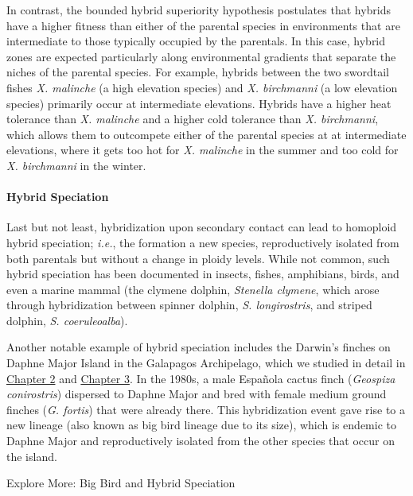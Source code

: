 \documentclass[
]{book}
\begin{document}
In contrast, the bounded hybrid superiority hypothesis postulates that hybrids have a higher fitness than either of the parental species in environments that are intermediate to those typically occupied by the parentals. In this case, hybrid zones are expected particularly along environmental gradients that separate the niches of the parental species. For example, hybrids between the two swordtail fishes \emph{X. malinche} (a high elevation species) and \emph{X. birchmanni} (a low elevation species) primarily occur at intermediate elevations. Hybrids have a higher heat tolerance than \emph{X. malinche} and a higher cold tolerance than \emph{X. birchmanni}, which allows them to outcompete either of the parental species at at intermediate elevations, where it gets too hot for \emph{X. malinche} in the summer and too cold for \emph{X. birchmanni} in the winter.

\hypertarget{hybrid-speciation}{%
\paragraph*{Hybrid Speciation}\label{hybrid-speciation}}

Last but not least, hybridization upon secondary contact can lead to homoploid hybrid speciation; \emph{i.e.}, the formation a new species, reproductively isolated from both parentals but without a change in ploidy levels. While not common, such hybrid speciation has been documented in insects, fishes, amphibians, birds, and even a marine mammal (the clymene dolphin, \emph{Stenella clymene}, which arose through hybridization between spinner dolphin, \emph{S. longirostris}, and striped dolphin, \emph{S. coeruleoalba}).

Another notable example of hybrid speciation includes the Darwin's finches on Daphne Major Island in the Galapagos Archipelago, which we studied in detail in \href{evidence-for-evolution.html\#case-study-darwins-finches}{Chapter 2} and \href{/a-mechanism-for-change.html\#darwins-logic}{Chapter 3}. In the 1980s, a male Española cactus finch (\emph{Geospiza conirostris}) dispersed to Daphne Major and bred with female medium ground finches (\emph{G. fortis}) that were already there. This hybridization event gave rise to a new lineage (also known as big bird lineage due to its size), which is endemic to Daphne Major and reproductively isolated from the other species that occur on the island.

Explore More: Big Bird and Hybrid Speciation
\end{document}
